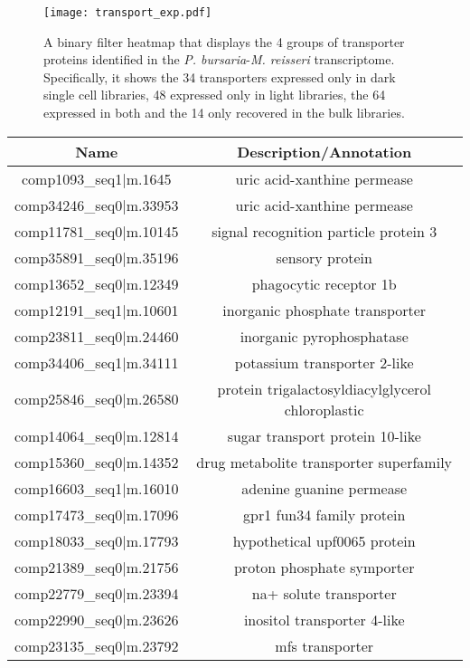  \begin{figure}
     \centering
     \texttt{[image: transport\_exp.pdf]}
     \caption{A binary filter heatmap that displays the 4 groups of transporter
         proteins identified in the \textit{P. bursaria}-\textit{M. reisseri} 
         transcriptome.  Specifically, it shows the 34 transporters expressed only
         in dark single cell libraries, 48 expressed only in light libraries, the 64
         expressed in both and the 14 only recovered in the bulk libraries.}
     \label{fig:binary_expression_heatmap}
 \end{figure}


\begin{table}
    \centering
    \begin{tabular}{|c|c|}
        \hline
        \textbf{Name} & \textbf{Description/Annotation} \\
        \hline
comp1093\_seq1|m.1645&uric acid-xanthine permease\\
comp34246\_seq0|m.33953&uric acid-xanthine permease	\\
comp11781\_seq0|m.10145&signal recognition particle protein 3\\
comp35891\_seq0|m.35196&sensory protein\\
comp13652\_seq0|m.12349&phagocytic receptor 1b\\
comp12191\_seq1|m.10601&inorganic phosphate transporter\\
comp23811\_seq0|m.24460&inorganic pyrophosphatase \\
comp34406\_seq1|m.34111&potassium transporter 2-like \\
comp25846\_seq0|m.26580&protein trigalactosyldiacylglycerol chloroplastic\\
comp14064\_seq0|m.12814&sugar transport protein 10-like\\
comp15360\_seq0|m.14352&drug metabolite transporter superfamily\\
comp16603\_seq1|m.16010&adenine guanine permease\\
comp17473\_seq0|m.17096&gpr1 fun34 family protein\\
comp18033\_seq0|m.17793&hypothetical upf0065 protein\\
comp21389\_seq0|m.21756&proton phosphate symporter\\
comp22779\_seq0|m.23394&na+ solute transporter\\
comp22990\_seq0|m.23626&inositol transporter 4-like\\
comp23135\_seq0|m.23792&mfs transporter\\

\end{tabular}
\end{table}
